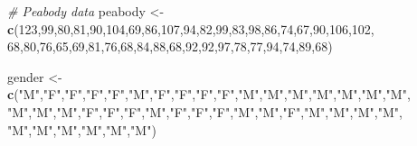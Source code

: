 \documentclass[
]{book}
\newenvironment{Shaded}{\begin{snugshade}}{\end{snugshade}}
\newcommand{\CommentTok}[1]{\textcolor[rgb]{0.56,0.35,0.01}{\textit{#1}}}
\newcommand{\DecValTok}[1]{\textcolor[rgb]{0.00,0.00,0.81}{#1}}
\newcommand{\FunctionTok}[1]{\textcolor[rgb]{0.13,0.29,0.53}{\textbf{#1}}}
\newcommand{\NormalTok}[1]{#1}
\newcommand{\OtherTok}[1]{\textcolor[rgb]{0.56,0.35,0.01}{#1}}
\newcommand{\StringTok}[1]{\textcolor[rgb]{0.31,0.60,0.02}{#1}}
\begin{document}
\begin{Shaded}
\begin{Highlighting}[]
\CommentTok{\# Peabody data}
\NormalTok{peabody }\OtherTok{\textless{}{-}} \FunctionTok{c}\NormalTok{(}\DecValTok{123}\NormalTok{,}\DecValTok{99}\NormalTok{,}\DecValTok{80}\NormalTok{,}\DecValTok{81}\NormalTok{,}\DecValTok{90}\NormalTok{,}\DecValTok{104}\NormalTok{,}\DecValTok{69}\NormalTok{,}\DecValTok{86}\NormalTok{,}\DecValTok{107}\NormalTok{,}\DecValTok{94}\NormalTok{,}\DecValTok{82}\NormalTok{,}\DecValTok{99}\NormalTok{,}\DecValTok{83}\NormalTok{,}\DecValTok{98}\NormalTok{,}\DecValTok{86}\NormalTok{,}\DecValTok{74}\NormalTok{,}\DecValTok{67}\NormalTok{,}\DecValTok{90}\NormalTok{,}\DecValTok{106}\NormalTok{,}\DecValTok{102}\NormalTok{,}
             \DecValTok{68}\NormalTok{,}\DecValTok{80}\NormalTok{,}\DecValTok{76}\NormalTok{,}\DecValTok{65}\NormalTok{,}\DecValTok{69}\NormalTok{,}\DecValTok{81}\NormalTok{,}\DecValTok{76}\NormalTok{,}\DecValTok{68}\NormalTok{,}\DecValTok{84}\NormalTok{,}\DecValTok{88}\NormalTok{,}\DecValTok{68}\NormalTok{,}\DecValTok{92}\NormalTok{,}\DecValTok{92}\NormalTok{,}\DecValTok{97}\NormalTok{,}\DecValTok{78}\NormalTok{,}\DecValTok{77}\NormalTok{,}\DecValTok{94}\NormalTok{,}\DecValTok{74}\NormalTok{,}\DecValTok{89}\NormalTok{,}\DecValTok{68}\NormalTok{)}

\NormalTok{gender }\OtherTok{\textless{}{-}} \FunctionTok{c}\NormalTok{(}\StringTok{"M"}\NormalTok{,}\StringTok{"F"}\NormalTok{,}\StringTok{"F"}\NormalTok{,}\StringTok{"F"}\NormalTok{,}\StringTok{"F"}\NormalTok{,}\StringTok{"M"}\NormalTok{,}\StringTok{"F"}\NormalTok{,}\StringTok{"F"}\NormalTok{,}\StringTok{"F"}\NormalTok{,}\StringTok{"F"}\NormalTok{,}\StringTok{"M"}\NormalTok{,}\StringTok{"M"}\NormalTok{,}\StringTok{"M"}\NormalTok{,}\StringTok{"M"}\NormalTok{,}\StringTok{"M"}\NormalTok{,}\StringTok{"M"}\NormalTok{,}\StringTok{"M"}\NormalTok{,}
            \StringTok{"M"}\NormalTok{,}\StringTok{"M"}\NormalTok{,}\StringTok{"M"}\NormalTok{,}\StringTok{"F"}\NormalTok{,}\StringTok{"F"}\NormalTok{,}\StringTok{"F"}\NormalTok{,}\StringTok{"M"}\NormalTok{,}\StringTok{"F"}\NormalTok{,}\StringTok{"F"}\NormalTok{,}\StringTok{"F"}\NormalTok{,}\StringTok{"M"}\NormalTok{,}\StringTok{"M"}\NormalTok{,}\StringTok{"F"}\NormalTok{,}\StringTok{"M"}\NormalTok{,}\StringTok{"M"}\NormalTok{,}\StringTok{"M"}\NormalTok{,}\StringTok{"M"}\NormalTok{,}
            \StringTok{"M"}\NormalTok{,}\StringTok{"M"}\NormalTok{,}\StringTok{"M"}\NormalTok{,}\StringTok{"M"}\NormalTok{,}\StringTok{"M"}\NormalTok{,}\StringTok{"M"}\NormalTok{)}


\end{Highlighting}
\end{Shaded}
\end{document}
